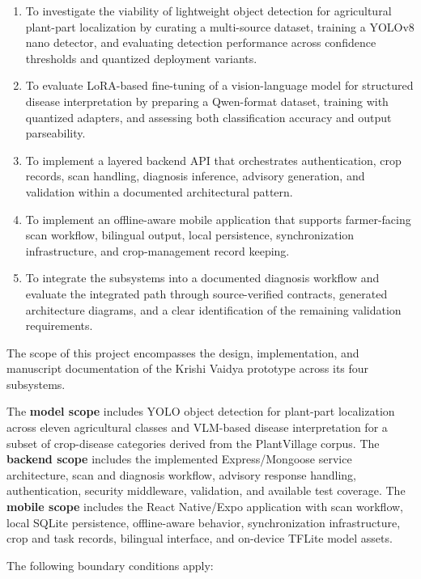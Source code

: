 \begin{enumerate}[label=\arabic*.]
\item To investigate the viability of lightweight object detection for agricultural plant-part
localization by curating a multi-source dataset, training a YOLOv8 nano detector, and
evaluating detection performance across confidence thresholds and quantized deployment variants.
\item To evaluate LoRA-based fine-tuning of a vision-language model for structured disease
interpretation by preparing a Qwen-format dataset, training with quantized adapters, and
assessing both classification accuracy and output parseability.
\item To implement a layered backend API that orchestrates authentication, crop records, scan
handling, diagnosis inference, advisory generation, and validation within a documented
architectural pattern.
\item To implement an offline-aware mobile application that supports farmer-facing scan workflow,
bilingual output, local persistence, synchronization infrastructure, and crop-management
record keeping.
\item To integrate the subsystems into a documented diagnosis workflow and evaluate the
integrated path through source-verified contracts, generated architecture diagrams, and a clear
identification of the remaining validation requirements.
\end{enumerate}


The scope of this project encompasses the design, implementation, and manuscript documentation
of the Krishi Vaidya prototype across its four subsystems.

The \textbf{model scope} includes YOLO object detection for plant-part localization across
eleven agricultural classes and VLM-based disease interpretation for a subset of crop-disease
categories derived from the PlantVillage corpus. The \textbf{backend scope} includes the
implemented Express/Mongoose service architecture, scan and diagnosis workflow, advisory
response handling, authentication, security middleware, validation, and available test coverage.
The \textbf{mobile scope} includes the React Native/Expo application with scan workflow, local
SQLite persistence, offline-aware behavior, synchronization infrastructure, crop and task
records, bilingual interface, and on-device TFLite model assets.

The following boundary conditions apply:

